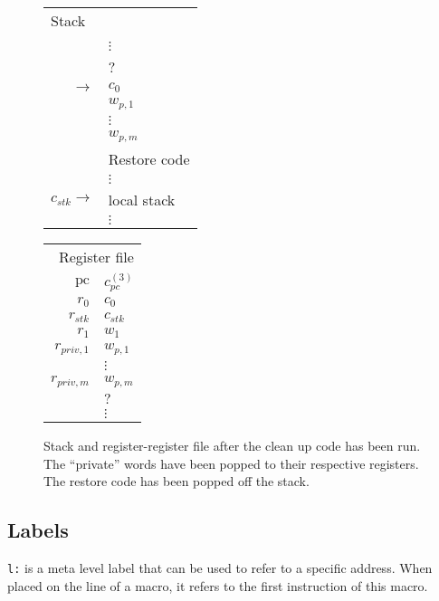 \documentclass[a4paper]{article}
\newcommand{\var}[1]{\mathit{#1}}
\newcommand{\pc}{\mathit{pc}}
\newcommand{\pcreg}{\mathrm{pc}}
\newcommand{\stk}{\var{stk}}
\begin{document}
\begin{figure}
  \label{fig:stack-after-restore-code}
  \centering
  \begin{tabular}[!h]{r | >{\raggedright\arraybackslash}p{3cm} |}
    \multicolumn{2}{l}{Stack} \\
    \cline{2-2}
 & \\
 & $\vdots$\\
    \cline{2-2}
 & ? \\
    \cline{2-2}
    $ \rightarrow$  & $c_0$ \\
    \cline{2-2}
 & $w_{p,1}$ \\
    \cline{2-2}
 & $\vdots$ \\
    \cline{2-2}
 & $w_{p,m}$ \\
    \cline{2-2}
 & Restore code \\
 & $\vdots$\\
    \cline{2-2}
    $c_\stk \rightarrow$  & local stack\\
 & $\vdots$\\
    \cline{2-2}
  \end{tabular}
  \hspace{1cm}
  \begin{tabular}{r | >{\centering\arraybackslash}p{0.75cm} |}
    \multicolumn{2}{r}{Register file} \\
    \cline{2-2}
    $\pcreg$ & $c_\pc^{(3)}$\\
    \cline{2-2}
    $r_0$  &  $c_0$ \\
    \cline{2-2}
    $r_{\var{stk}}$  & $c_{\var{stk}}$ \\
    \cline{2-2}
    $r_1$ & $w_1$ \\
    \cline{2-2}
    $r_{\var{priv},1}$ & $w_{p,1}$\\
    \cline{2-2}
             & $\vdots$ \\
    \cline{2-2}
    $r_{\var{priv},m}$ & $w_{p,m}$ \\
    \cline{2-2}
             & $?$ \\
    \cline{2-2}
             & $\vdots$ \\
    \cline{2-2}
  \end{tabular}
  \caption{ Stack and register-register file after the clean up code has been run. The ``private'' words have been popped to their respective registers. The restore code has been popped off the stack. }
\end{figure}


\subsection{Labels}
\texttt{l:} is a meta level label that can be used to refer to a specific address. When placed on the line of a macro, it refers to the first instruction of this macro.
\clearpage
\end{document}
